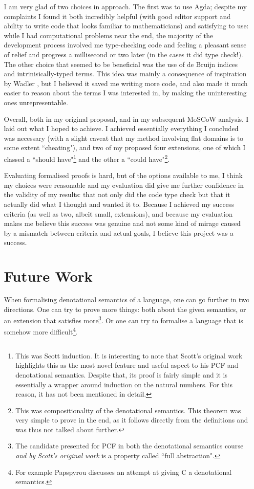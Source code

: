 \documentclass[12pt,a4paper,twoside,openright]{report}
\begin{document}
I am very glad of two choices in approach. The first was to use Agda; despite my complaints I found it both incredibly helpful (with good editor support and ability to write code that looks familiar to mathematicians) and satisfying to use: while I had computational problems near the end, the majority of the development process involved me type-checking code and feeling a pleasant sense of relief and progress a millisecond or two later (in the cases it did type check!). The other choice that seemed to be beneficial was the use of de Bruijn indices and intrinisically-typed terms. This idea was mainly a consequence of inspiration by Wadler \cite{PLFA}, but I believed it saved me writing more code, and also made it much easier to reason about the terms I was interested in, by making the uninteresting ones unrepresentable. 
	
Overall, both in my original proposal, and in my subsequent MoSCoW analysis, I laid out what I hoped to achieve. I achieved essentially everything I concluded was necessary (with a slight caveat that my method involving flat domains is to some extent ``cheating"), and two of my proposed four extensions, one of which I classed a ``should have"\footnote{This was Scott induction. It is interesting to note that Scott's original work highlights this as the most novel feature and useful aspect to his PCF and denotational semantics. Despite that, its proof is fairly simple and it is essentially a wrapper around induction on the natural numbers. For this reason, it has not been mentioned in detail.} and the other a ``could have"\footnote{This was compositionality of the denotational semantics. This theorem was very simple to prove in the end, as it follows directly from the definitions and was thus not talked about further.}. 

Evaluating formalised proofs is hard, but of the options available to me, I think my choices were reasonable and my evaluation did give me further confidence in the validity of my results: that not only did the code type check but that it actually did what I thought and wanted it to. Because I achieved my success criteria (as well as two, albeit small, extensions), and because my evaluation makes me believe this success was genuine and not some kind of mirage caused by a mismatch between criteria and actual goals, I believe this project was a success.
\section{Future Work}
When formalising denotational semantics of a language, one can go further in two directions. One can try to prove more things: both about the given semantics, or an extension that satisfies more\footnote{The candidate presented for PCF in both the denotational semantics course \textit{and by Scott's original work} is a property called ``full abstraction".}. Or one can try to formalise a language that is somehow more difficult\footnote{For example Papspyrou \cite{C-DenSem} discusses an attempt at giving C a denotational semantics.}. 
	
\end{document}
